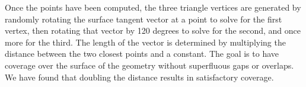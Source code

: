 Once the points have been computed, the three triangle vertices are generated by randomly rotating the surface tangent vector at a point to solve for the first vertex, then rotating that vector by 120 degrees to solve for the second, and once more for the third. The length of the vector is determined by multiplying the distance between the two closest points and a constant. The goal is to have coverage over the surface of the geometry without superfluous gaps or overlaps. We have found that doubling the distance results in satisfactory coverage.


